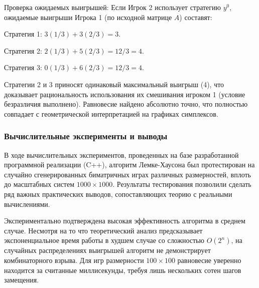 Проверка ожидаемых выигрышей:
Если Игрок 2 использует стратегию $y^0$, ожидаемые выигрыши Игрока 1 (по исходной матрице $A$) составят:

Стратегия 1: $3(1/3) + 3(2/3) = 3$.

Стратегия 2: $2(1/3) + 5(2/3) = 12/3 = 4$.

Стратегия 3: $0(1/3) + 6(2/3) = 12/3 = 4$.

Стратегии 2 и 3 приносят одинаковый максимальный выигрыш (4), что доказывает рациональность использования их смешивания игроком 1 (условие безразличия выполнено). Равновесие найдено абсолютно точно, что полностью совпадает с геометрической интерпретацией на графиках симплексов.

\subsubsection{Вычислительные эксперименты и выводы}

В ходе вычислительных экспериментов, проведенных на базе разработанной программной реализации (C++), алгоритм Лемке-Хаусона был протестирован на случайно сгенерированных биматричных играх различных размерностей, вплоть до масштабных систем $1000 \times 1000$. Результаты тестирования позволили сделать ряд важных практических выводов, сопоставляющих теорию с реальными вычислениями.

Экспериментально подтверждена высокая эффективность алгоритма в среднем случае. Несмотря на то что теоретический анализ предсказывает экспоненциальное время работы в худшем случае со сложностью $O(2^n)$, на случайных распределениях выигрышей алгоритм не демонстрирует комбинаторного взрыва. Для игр размерности $100 \times 100$ равновесие уверенно находится за считанные миллисекунды, требуя лишь нескольких сотен шагов замещения.